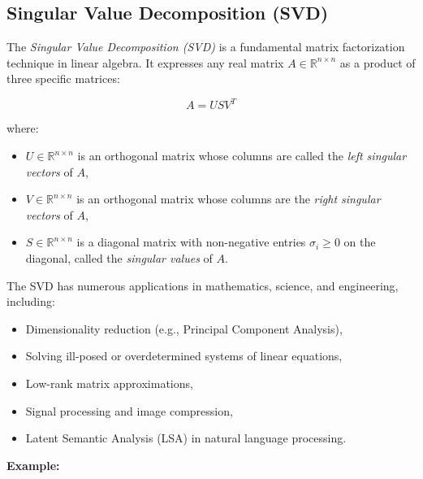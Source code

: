 \subsection{Singular Value Decomposition (SVD)}

The \emph{Singular Value Decomposition (SVD)} is a fundamental matrix factorization technique in linear 
algebra. It expresses any real matrix \( A \in \mathbb{R}^{n \times n} \) as a product of three specific 
matrices:

\[
    A = U S V^T
\]

where:

\begin{itemize}

    \item \( U \in \mathbb{R}^{n \times n} \) is an orthogonal matrix whose columns are called the 
          \emph{left singular vectors} of \( A \),

    \item \( V \in \mathbb{R}^{n \times n} \) is an orthogonal matrix whose columns are the 
          \emph{right singular vectors} of \( A \),

    \item \( S \in \mathbb{R}^{n \times n} \) is a diagonal matrix with non-negative entries 
          \( \sigma_i \geq 0 \) on the diagonal, called the \emph{singular values} of \( A \).

\end{itemize}


The SVD has numerous applications in mathematics, science, and engineering, including:

\begin{itemize}

    \item Dimensionality reduction (e.g., Principal Component Analysis),

    \item Solving ill-posed or overdetermined systems of linear equations,

    \item Low-rank matrix approximations,

    \item Signal processing and image compression,

    \item Latent Semantic Analysis (LSA) in natural language processing.

\end{itemize}

\textbf{Example:}

